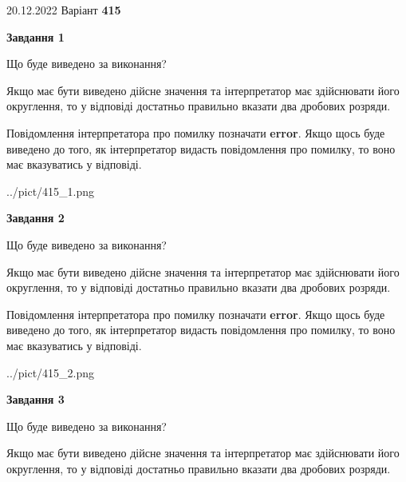 \documentclass[12pt, ukrainian]{article}
\begin{document}
{20.12.2022 Варіант \No \textbf { 415 }\par}
{
\begin {Large}

{\begin {center}\textbf{Завдання 1}\end {center}}\par
Що буде виведено за виконання? \par

Якщо має бути виведено дійсне значення та інтерпретатор має здійснювати його округлення, 
то у відповіді достатньо правильно вказати два дробових розряди.

Повідомлення інтерпретатора про помилку позначати \textbf{error}.
Якщо щось буде виведено до того, як інтерпретатор видасть повідомлення про помилку, 
то воно має вказуватись у відповіді. \par

\begin{center}
	{../pict/415_1.png}
\end{center}
\newpage

{\begin {center}\textbf{Завдання 2}\end {center}}\par
Що буде виведено за виконання? \par

Якщо має бути виведено дійсне значення та інтерпретатор має здійснювати його округлення, 
то у відповіді достатньо правильно вказати два дробових розряди.

Повідомлення інтерпретатора про помилку позначати \textbf{error}.
Якщо щось буде виведено до того, як інтерпретатор видасть повідомлення про помилку, 
то воно має вказуватись у відповіді. \par

\begin{center}
	{../pict/415_2.png}
\end{center}
\newpage

{\begin {center}\textbf{Завдання 3}\end {center}}\par
Що буде виведено за виконання? \par

Якщо має бути виведено дійсне значення та інтерпретатор має здійснювати його округлення, 
то у відповіді достатньо правильно вказати два дробових розряди.


\end{Large}}
\end{document}
